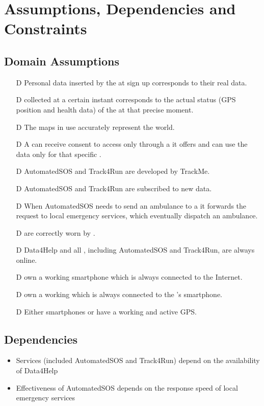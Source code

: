 \documentclass[../../rasd.tex]{subfiles}
\begin{document}
\section{Assumptions, Dependencies and Constraints}
	\subsection{Domain Assumptions}
	 	\begin{itemize}
		 	\item[D\subs{1}]Personal data inserted by the  at sign up corresponds to their real data.
			\item[D\subs{2}] collected at a certain instant corresponds to the actual status (GPS position and health data) of the  at that precise moment.				
			\item[D\subs{3}]The maps in use accurately represent the world.
			\item[D\subs{4}]A  can receive consent to  access only through a  it offers and can use the data only for that specific .
			\item[D\subs{5}]AutomatedSOS and Track4Run are  developed by TrackMe.
			\item[D\subs{6}]AutomatedSOS and Track4Run are subscribed to new data.
			\item[D\subs{7}]When AutomatedSOS needs to send an ambulance to a  it forwards the request to local emergency services, which eventually dispatch an ambulance.
			\item[D\subs{8}] are correctly worn by .
			\item[D\subs{9}]Data4Help and all , including AutomatedSOS and Track4Run, are always online.
			\item[D\subs{10}] own a working smartphone which is always connected to the Internet.
			\item[D\subs{11}] own a working  which is always connected to the 's smartphone.
			\item[D\subs{12}]Either smartphones or  have a working and active GPS.
		\end{itemize}	
	\subsection{Dependencies}
		\begin{itemize}
			\item Services (included AutomatedSOS and Track4Run) depend on the availability of Data4Help
			\item Effectiveness of AutomatedSOS depends on the response speed of local emergency services
		\end{itemize}
\end{document}
